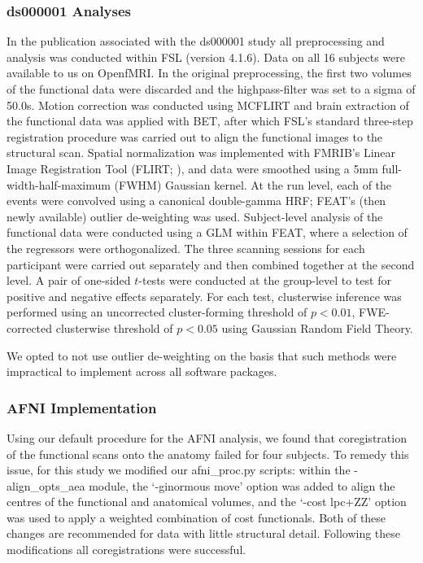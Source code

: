 \subsubsection{ds000001 Analyses}
In the publication associated with the ds000001 study all preprocessing and analysis was conducted within FSL (version 4.1.6). Data on all 16 subjects were available to us on OpenfMRI. In the original preprocessing, the first two volumes of the functional data were discarded and the highpass-filter was set to a sigma of 50.0s. Motion correction was conducted using MCFLIRT and brain extraction of the functional data was applied with BET, after which FSL's standard three-step registration procedure was carried out to align the functional images to the structural scan. Spatial normalization was implemented with FMRIB's Linear Image Registration Tool (FLIRT; \citep{Jenkinson2002-qf}), and data were smoothed using a 5mm full-width-half-maximum (FWHM) Gaussian kernel. At the run level, each of the events were convolved using a canonical double-gamma HRF; FEAT's (then newly available) outlier de-weighting was used. Subject-level analysis of the functional data were conducted using a GLM within FEAT, where a selection of the regressors were orthogonalized. The three scanning sessions for each participant were carried out separately and then combined together at the second level. A pair of one-sided $t$-tests were conducted at the group-level to test for positive and negative effects separately. For each test, clusterwise inference was performed using an uncorrected cluster-forming threshold of $p < 0.01$, FWE-corrected clusterwise threshold of $p < 0.05$ using Gaussian Random Field Theory.

We opted to not use outlier de-weighting on the basis that such methods were impractical to implement across all software packages.

\subsubsection{AFNI Implementation}
Using our default procedure for the AFNI analysis, we found that coregistration of the functional scans onto the anatomy failed for four subjects. To remedy this issue, for this study we modified our afni\_proc.py scripts: within the -align\_opts\_aea module, the `-ginormous move' option was added to align the centres of the functional and anatomical volumes, and the `-cost lpc+ZZ' option was used to apply a weighted combination of cost functionals. Both of these changes are recommended for data with little structural detail. Following these modifications all coregistrations were successful.

